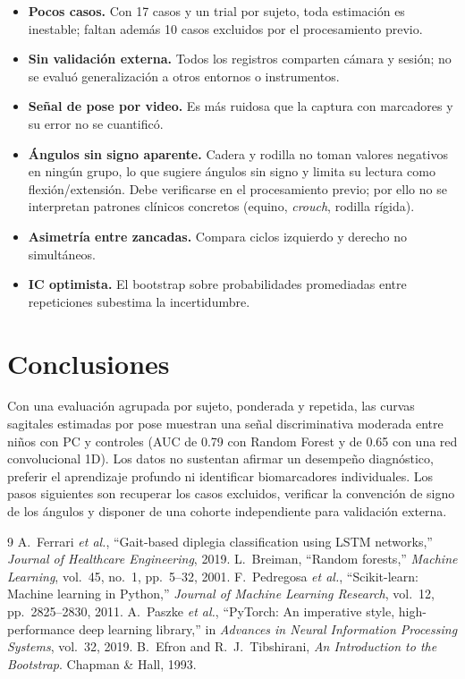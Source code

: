 \documentclass[10pt,twocolumn,a4paper]{article}
\begin{document}
\begin{itemize}\itemsep0pt
\item \textbf{Pocos casos.} Con 17 casos y un trial por sujeto, toda estimación es inestable; faltan además 10 casos excluidos por el procesamiento previo.
\item \textbf{Sin validación externa.} Todos los registros comparten cámara y sesión; no se evaluó generalización a otros entornos o instrumentos.
\item \textbf{Señal de pose por video.} Es más ruidosa que la captura con marcadores y su error no se cuantificó.
\item \textbf{Ángulos sin signo aparente.} Cadera y rodilla no toman valores negativos en ningún grupo, lo que sugiere ángulos sin signo y limita su lectura como flexión/extensión. Debe verificarse en el procesamiento previo; por ello no se interpretan patrones clínicos concretos (equino, \emph{crouch}, rodilla rígida).
\item \textbf{Asimetría entre zancadas.} Compara ciclos izquierdo y derecho no simultáneos.
\item \textbf{IC optimista.} El bootstrap sobre probabilidades promediadas entre repeticiones subestima la incertidumbre.
\end{itemize}

\section{Conclusiones}

Con una evaluación agrupada por sujeto, ponderada y repetida, las curvas sagitales estimadas por pose muestran una señal discriminativa moderada entre niños con PC y controles (AUC de 0.79 con Random Forest y de 0.65 con una red convolucional 1D). Los datos no sustentan afirmar un desempeño diagnóstico, preferir el aprendizaje profundo ni identificar biomarcadores individuales. Los pasos siguientes son recuperar los casos excluidos, verificar la convención de signo de los ángulos y disponer de una cohorte independiente para validación externa.

\begin{thebibliography}{9}\small
{} A.~Ferrari \emph{et al.}, ``Gait-based diplegia classification using LSTM networks,'' \emph{Journal of Healthcare Engineering}, 2019.
 L.~Breiman, ``Random forests,'' \emph{Machine Learning}, vol.~45, no.~1, pp.~5--32, 2001.
 F.~Pedregosa \emph{et al.}, ``Scikit-learn: Machine learning in Python,'' \emph{Journal of Machine Learning Research}, vol.~12, pp.~2825--2830, 2011.
 A.~Paszke \emph{et al.}, ``PyTorch: An imperative style, high-performance deep learning library,'' in \emph{Advances in Neural Information Processing Systems}, vol.~32, 2019.
 B.~Efron and R.~J.~Tibshirani, \emph{An Introduction to the Bootstrap}. Chapman \& Hall, 1993.
\end{thebibliography}
\end{document}
